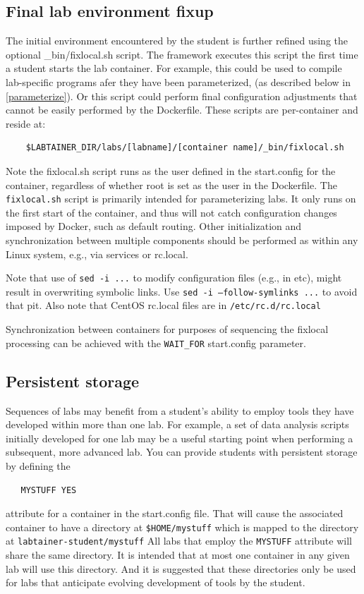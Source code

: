 \documentclass[12pt]{article}
\begin{document}
\subsection{Final lab environment fixup}
The initial environment encountered by the student is further refined using
the optional \_bin/fixlocal.sh script.  The framework executes
this script the first time a student starts the lab container.  For example,
this could be used to compile lab-specific programs afer they have been parameterized,
(as described below in \ref{parameterize}).  Or this script could perform final configuration adjustments
that cannot be easily performed by the Dockerfile.  These scripts are per-container
and reside at:
\begin{verbatim}
    $LABTAINER_DIR/labs/[labname]/[container name]/_bin/fixlocal.sh
\end{verbatim}
\noindent Note the fixlocal.sh script runs as the user defined in the start.config for the container, 
regardless of whether root is set as the user in the Dockerfile.  The {\tt fixlocal.sh} script is primarily
intended for parameterizing labs.  It only runs on the first start of the container, and thus will not catch configuration changes 
imposed by Docker, such as default routing. Other initialization and synchronization between multiple components 
should be performed as within any Linux system, e.g., via services or rc.local.

Note that use of {\tt sed -i ...} to modify configuration files (e.g., in etc), might result in overwriting symbolic links.
Use {\tt sed -i --follow-symlinks ...} to avoid that pit.  Also note that CentOS rc.local files are in {\tt /etc/rc.d/rc.local}

Synchronization between containers for purposes of sequencing the fixlocal processing can be achieved with the
{\tt WAIT\_FOR} start.config parameter.

\subsection{Persistent storage}
\label{persistent}
Sequences of labs may benefit from a student's ability to employ tools they have developed within more than one lab.
For example, a set of data analysis scripts initially developed for one lab may be a useful starting point when
performing a subsequent, more advanced lab.  You can provide students with persistent storage by defining the
\begin{verbatim}
   MYSTUFF YES
\end{verbatim}
\noindent attribute for a container in the start.config file.  That will cause the associated container to have
a directory at {\tt \$HOME/mystuff} which is mapped to the directory at {\tt labtainer-student/mystuff}
All labs that employ the {\tt MYSTUFF} attribute will share the same directory.  It is intended that at most one
container in any given lab will use this directory.  And it is suggested that these directories only be used for
labs that anticipate evolving development of tools by the student.  
\end{document}
